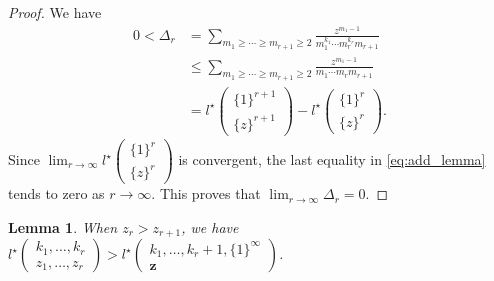 \documentclass[12pt,a4paper]{article}
\newtheorem{lemma}[defi]{Lemma}
\theoremstyle{remark}
\begin{document}
\begin{proof}
We have
\begin{equation}\label{eq:add_lemma}
\begin{split}
0<\Delta_r 
&= \sum_{m_1\ge \cdots \ge m_{r+1}\ge 2}
\frac{z^{m_1-1}
}{m_1^{k_1}\cdots m_r^{k_r}m_{r+1}}\\
& \le 
\sum_{m_1\ge \cdots \ge m_{r+1}\ge 2}
\frac{z^{m_1-1}}{m_1\cdots m_rm_{r+1}}\\
&=
l^{\star}\begin{pmatrix}
 \{1\}^{r+1}  \\
 \{z\}^{r+1}
\end{pmatrix}
-
l^{\star}\begin{pmatrix}
 \{1\}^{r}  \\
 \{z\}^{r}
 \end{pmatrix}.
\end{split}
\end{equation}
Since 
$\displaystyle \lim_{r\to \infty} 
l^{\star}\begin{pmatrix}
 \{1\}^{r}  \\
 \{z\}^{r}  
\end{pmatrix} $
is convergent, the last equality in
\eqref{eq:add_lemma}
tends to zero as $r\to \infty$.
This proves that 
$\displaystyle\lim_{r\to\infty}\Delta_r=0$.
\end{proof}





\begin{lemma}\label{lemma:non-dense}
When $z_r>z_{r+1}$, we have
$l^{\star}\begin{pmatrix}
k_1,\ldots, k_r\\
z_1, \ldots, z_r
\end{pmatrix}
>
l^{\star}\begin{pmatrix}
k_1,\ldots, k_r+1, \{1\}^{\infty}\\
\boldsymbol{z}
\end{pmatrix}$.

\end{lemma}
\end{document}
